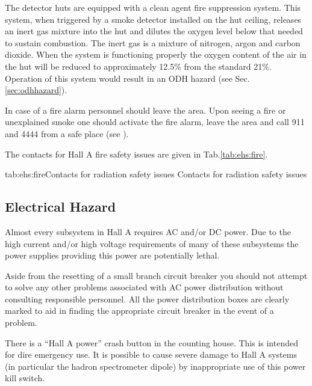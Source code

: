 The detector huts are equipped with a clean agent fire suppression system. This system, when triggered 
 by a smoke detector installed on the hut ceiling, releases an inert gas mixture into the hut and dilutes 
 the oxygen level below that needed to sustain combustion. The inert gas is a mixture of nitrogen, 
 argon and carbon dioxide. When the system is functioning properly the oxygen content of the air in the 
 hut will be reduced to approximately 12.5\% from the standard 21\%. Operation of this system
 would result in an ODH hazard (see Sec.\ref{sec:odhhazard}).

 In case of a fire alarm personnel should leave the area. Upon seeing a fire
 or unexplained smoke one should activate the fire alarm, leave the area and
 call 911 and 4444 from a safe place (see \cite{EHScebaf}).
  
 The contacts for Hall A fire safety issues are given in Tab.\ref{tab:ehs:fire}.
 
 \begin{namestab}{tab:ehs:fire}{Contacts for radiation safety issues}{%
   Contacts for radiation safety issues}
 \end{namestab}

\begin{safetyen}{0}{0}
\section{Electrical Hazard} 
\label{sec:electrhazard}
\end{safetyen}

 Almost every subsystem in Hall A requires AC and/or DC power. Due to the high current
 and/or high voltage requirements of many of these subsystems the power supplies providing this 
 power are potentially lethal.

 Aside from the resetting of a small branch circuit breaker you should not attempt to solve
 any other problems associated with AC power distribution without consulting responsible personnel. All
 the power distribution boxes are clearly marked to aid in finding the appropriate circuit breaker in
 the event of a problem.

 There is a ``Hall A power'' crash button in the counting house. This is intended for dire emergency use. 
 It is possible to cause severe damage to Hall A systems (in particular the hadron spectrometer dipole) 
 by inappropriate use of this power kill switch.

